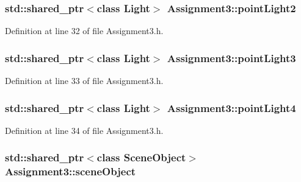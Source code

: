 \subsubsection[{point\+Light2}]{\setlength{\rightskip}{0pt plus 5cm}std\+::shared\+\_\+ptr$<$class {\bf Light}$>$ Assignment3\+::point\+Light2\hspace{0.3cm}{\ttfamily [private]}}\label{class_assignment3_ad6ea1201b058dbac9fd0e7b67015cf61}


Definition at line 32 of file Assignment3.\+h.

\hypertarget{class_assignment3_a59be58dbfebe4aa36097131bf654a7ae}{}
\subsubsection[{point\+Light3}]{\setlength{\rightskip}{0pt plus 5cm}std\+::shared\+\_\+ptr$<$class {\bf Light}$>$ Assignment3\+::point\+Light3\hspace{0.3cm}{\ttfamily [private]}}\label{class_assignment3_a59be58dbfebe4aa36097131bf654a7ae}


Definition at line 33 of file Assignment3.\+h.

\hypertarget{class_assignment3_af720bbd23f1f59d15908eb602a41725b}{}
\subsubsection[{point\+Light4}]{\setlength{\rightskip}{0pt plus 5cm}std\+::shared\+\_\+ptr$<$class {\bf Light}$>$ Assignment3\+::point\+Light4\hspace{0.3cm}{\ttfamily [private]}}\label{class_assignment3_af720bbd23f1f59d15908eb602a41725b}


Definition at line 34 of file Assignment3.\+h.

\hypertarget{class_assignment3_a0bc175d3efff30c5f4aa3ffa1272338a}{}
\subsubsection[{scene\+Object}]{\setlength{\rightskip}{0pt plus 5cm}std\+::shared\+\_\+ptr$<$class {\bf Scene\+Object}$>$ Assignment3\+::scene\+Object\hspace{0.3cm}{\ttfamily [private]}}\label{class_assignment3_a0bc175d3efff30c5f4aa3ffa1272338a}


